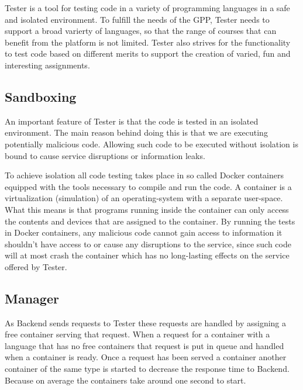 Tester is a tool for testing code in a variety of programming languages in a safe and isolated environment. To fulfill the needs of the GPP, Tester needs to support a  broad varierty of languages, so that the range of courses that can benefit from the platform is not limited. Tester also strives for the functionality to test code based on different merits to support the creation of varied, fun and interesting assignments.

\subsection{Sandboxing}
An important feature of Tester is that the code is tested in an isolated environment. The main reason behind doing this is that we are executing potentially malicious code. Allowing such code to be executed without isolation is bound to cause service disruptions or information leaks.

To achieve isolation all code testing takes place in so called Docker containers equipped with the tools necessary to compile and run the code. A container is a virtualization (simulation) of an operating-system with a separate user-space. What this means is that programs running inside the container can only access the contents and devices that are assigned to the container. By running the tests in Docker containers, any malicious code cannot gain access to information it shouldn't have access to or cause any disruptions to the service, since such code will at most crash the container which has no long-lasting effects on the service offered by Tester.
\subsection{Manager}

As Backend sends requests to Tester these requests are handled by assigning a free container serving that request.
When a request for a container with a language that has no free containers that
request is put in queue and handled when a container is ready. Once a request has
been served a container another container of the same type is started to decrease
the response time to Backend. Because on average the containers
take around one second to start.

